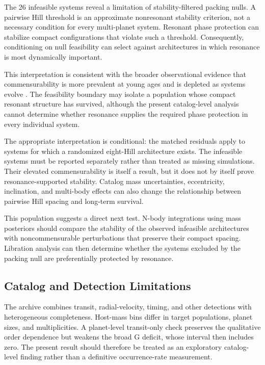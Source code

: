 \documentclass[twocolumn,linenumbers]{aastex631}
\begin{document}
The 26 infeasible systems reveal a limitation of stability-filtered packing
nulls. A pairwise Hill threshold is an approximate nonresonant stability
criterion, not a necessary condition for every multi-planet system. Resonant
phase protection can stabilize compact configurations that violate such a
threshold. Consequently, conditioning on null feasibility can select against
architectures in which resonance is most dynamically important.

This interpretation is consistent with the broader observational evidence
that commensurability is more prevalent at young ages and is depleted as
systems evolve \citep{dai2024,hamer2024}. The feasibility boundary may isolate
a population whose compact resonant structure has survived, although the
present catalog-level analysis cannot determine whether resonance supplies
the required phase protection in every individual system.

The appropriate interpretation is conditional: the matched residuals apply to
systems for which a randomized eight-Hill architecture exists. The infeasible
systems must be reported separately rather than treated as missing simulations.
Their elevated commensurability is itself a result, but it does not by itself
prove resonance-supported stability. Catalog mass uncertainties, eccentricity,
inclination, and multi-body effects can also change the relationship between
pairwise Hill spacing and long-term survival.

This population suggests a direct next test. N-body integrations using mass
posteriors should compare the stability of the observed infeasible
architectures with noncommensurable perturbations that preserve their compact
spacing. Libration analysis can then determine whether the systems excluded by
the packing null are preferentially protected by resonance.

\subsection{Catalog and Detection Limitations}

The archive combines transit, radial-velocity, timing, and other detections
with heterogeneous completeness. Host-mass bins differ in target populations,
planet sizes, and multiplicities. A planet-level transit-only check preserves
the qualitative order dependence but weakens the broad G deficit, whose
interval then includes zero. The present result should therefore be treated as
an exploratory catalog-level finding rather than a definitive occurrence-rate
measurement.
\end{document}

